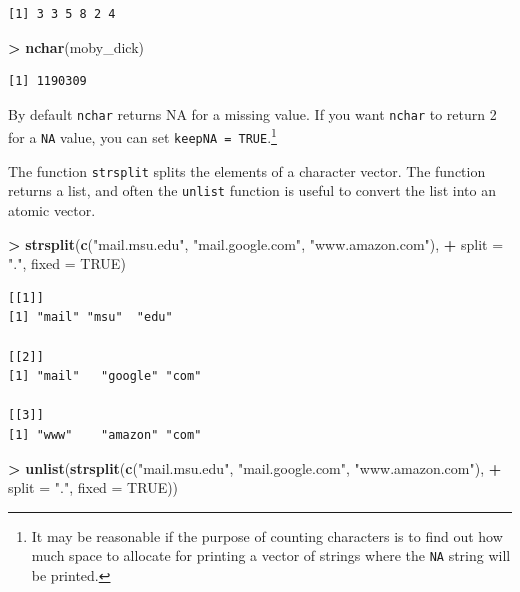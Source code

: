 \documentclass[]{krantz}
\makeatletter
\newenvironment{Shaded}{\begin{snugshade}}{\end{snugshade}}
\newcommand{\KeywordTok}[1]{\textcolor[rgb]{0.27,0.27,0.27}{\textbf{#1}}}
\newcommand{\DataTypeTok}[1]{\textcolor[rgb]{0.27,0.27,0.27}{#1}}
\newcommand{\StringTok}[1]{\textcolor[rgb]{0.5,0.5,0.5}{#1}}
\newcommand{\OtherTok}[1]{\textcolor[rgb]{0.37,0.37,0.37}{#1}}
\newcommand{\OperatorTok}[1]{\textcolor[rgb]{0.43,0.43,0.43}{\textbf{#1}}}
\newcommand{\NormalTok}[1]{#1}
\newenvironment{kframe}{%
\medskip{}
\setlength{\fboxsep}{.8em}
 \def\at@end@of@kframe{}%
 \ifinner\ifhmode%
  \def\at@end@of@kframe{\end{minipage}}%
  \begin{minipage}{\columnwidth}%
 \fi\fi%
 \def\FrameCommand##1{\hskip\@totalleftmargin \hskip-\fboxsep
 \colorbox{shadecolor}{##1}\hskip-\fboxsep
     \hskip-\linewidth \hskip-\@totalleftmargin \hskip\columnwidth}%
 \MakeFramed {\advance\hsize-\width
   \@totalleftmargin\z@ \linewidth\hsize
   \@setminipage}}%
 {\par\unskip\endMakeFramed%
 \at@end@of@kframe}
\renewenvironment{Shaded}{\begin{kframe}}{\end{kframe}}
\makeatother
\begin{document}
\begin{verbatim}
[1] 3 3 5 8 2 4
\end{verbatim}

\begin{Shaded}
\begin{Highlighting}[]
\OperatorTok{>}\StringTok{ }\KeywordTok{nchar}\NormalTok{(moby_dick)}
\end{Highlighting}
\end{Shaded}

\begin{verbatim}
[1] 1190309
\end{verbatim}

By default \texttt{nchar} returns NA for a missing value. If you want
\texttt{nchar} to return 2 for a \texttt{NA} value, you can set
\texttt{keepNA\ =\ TRUE}.\footnote{It may be reasonable if the purpose
  of counting characters is to find out how much space to allocate for
  printing a vector of strings where the \texttt{NA} string will be
  printed.}

The function \texttt{strsplit} splits the elements of a character
vector. The function returns a list, and often the \texttt{unlist}
function is useful to convert the list into an atomic vector.

\begin{Shaded}
\begin{Highlighting}[]
\OperatorTok{>}\StringTok{ }\KeywordTok{strsplit}\NormalTok{(}\KeywordTok{c}\NormalTok{(}\StringTok{"mail.msu.edu"}\NormalTok{, }\StringTok{"mail.google.com"}\NormalTok{, }\StringTok{"www.amazon.com"}\NormalTok{),}
\OperatorTok{+}\StringTok{          }\DataTypeTok{split =} \StringTok{"."}\NormalTok{, }\DataTypeTok{fixed =} \OtherTok{TRUE}\NormalTok{)}
\end{Highlighting}
\end{Shaded}

\begin{verbatim}
[[1]]
[1] "mail" "msu"  "edu" 

[[2]]
[1] "mail"   "google" "com"   

[[3]]
[1] "www"    "amazon" "com"   
\end{verbatim}

\begin{Shaded}
\begin{Highlighting}[]
\OperatorTok{>}\StringTok{ }\KeywordTok{unlist}\NormalTok{(}\KeywordTok{strsplit}\NormalTok{(}\KeywordTok{c}\NormalTok{(}\StringTok{"mail.msu.edu"}\NormalTok{, }\StringTok{"mail.google.com"}\NormalTok{, }\StringTok{"www.amazon.com"}\NormalTok{),}
\OperatorTok{+}\StringTok{                 }\DataTypeTok{split =} \StringTok{"."}\NormalTok{, }\DataTypeTok{fixed =} \OtherTok{TRUE}\NormalTok{))}
\end{Highlighting}
\end{Shaded}
\end{document}
